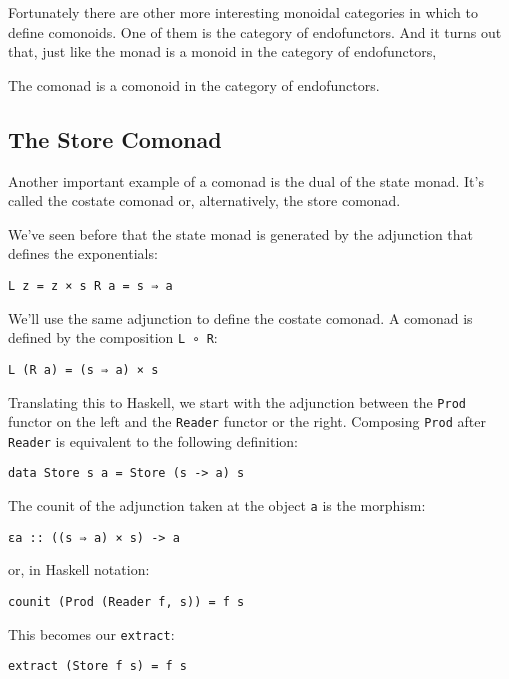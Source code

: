 Fortunately there are other more interesting monoidal categories in
which to define comonoids. One of them is the category of endofunctors.
And it turns out that, just like the monad is a monoid in the category
of endofunctors,

The comonad is a comonoid in the category of endofunctors.

\subsection{The Store Comonad}\label{the-store-comonad}

Another important example of a comonad is the dual of the state monad.
It's called the costate comonad or, alternatively, the store comonad.

We've seen before that the state monad is generated by the adjunction
that defines the exponentials:

\begin{verbatim}
L z = z × s R a = s ⇒ a
\end{verbatim}

We'll use the same adjunction to define the costate comonad. A comonad
is defined by the composition \texttt{L\ ∘\ R}:

\begin{verbatim}
L (R a) = (s ⇒ a) × s
\end{verbatim}

Translating this to Haskell, we start with the adjunction between the
\texttt{Prod} functor on the left and the \texttt{Reader} functor or the
right. Composing \texttt{Prod} after \texttt{Reader} is equivalent to
the following definition:

\begin{verbatim}
data Store s a = Store (s -> a) s
\end{verbatim}

The counit of the adjunction taken at the object \texttt{a} is the
morphism:

\begin{verbatim}
εa :: ((s ⇒ a) × s) -> a
\end{verbatim}

or, in Haskell notation:

\begin{verbatim}
counit (Prod (Reader f, s)) = f s
\end{verbatim}

This becomes our \texttt{extract}:

\begin{verbatim}
extract (Store f s) = f s
\end{verbatim}

